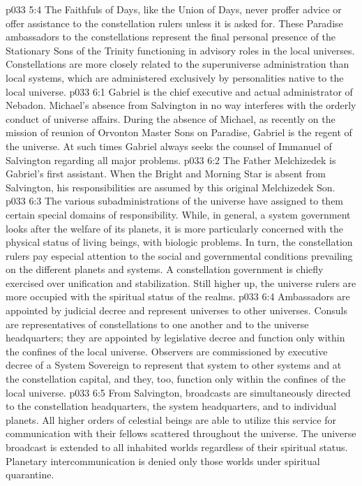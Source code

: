 \vs p033 5:4 The Faithfuls of Days, like the Union of Days, never proffer advice or offer assistance to the constellation rulers unless it is asked for. These Paradise ambassadors to the constellations represent the final personal presence of the Stationary Sons of the Trinity functioning in advisory roles in the local universes. Constellations are more closely related to the superuniverse administration than local systems, which are administered exclusively by personalities native to the local universe.
\vs p033 6:1 Gabriel is the chief executive and actual administrator of Nebadon. Michael’s absence from Salvington in no way interferes with the orderly conduct of universe affairs. During the absence of Michael, as recently on the mission of reunion of Orvonton Master Sons on Paradise, Gabriel is the regent of the universe. At such times Gabriel always seeks the counsel of Immanuel of Salvington regarding all major problems.
\vs p033 6:2 The Father Melchizedek is Gabriel’s first assistant. When the Bright and Morning Star is absent from Salvington, his responsibilities are assumed by this original Melchizedek Son.
\vs p033 6:3 \pc The various subadministrations of the universe have assigned to them certain special domains of responsibility. While, in general, a system government looks after the welfare of its planets, it is more particularly concerned with the physical status of living beings, with biologic problems. In turn, the constellation rulers pay especial attention to the social and governmental conditions prevailing on the different planets and systems. A constellation government is chiefly exercised over unification and stabilization. Still higher up, the universe rulers are more occupied with the spiritual status of the realms.
\vs p033 6:4 \pc Ambassadors are appointed by judicial decree and represent universes to other universes. Consuls are representatives of constellations to one another and to the universe headquarters; they are appointed by legislative decree and function only within the confines of the local universe. Observers are commissioned by executive decree of a System Sovereign to represent that system to other systems and at the constellation capital, and they, too, function only within the confines of the local universe.
\vs p033 6:5 \pc From Salvington, broadcasts are simultaneously directed to the constellation headquarters, the system headquarters, and to individual planets. All higher orders of celestial beings are able to utilize this service for communication with their fellows scattered throughout the universe. The universe broadcast is extended to all inhabited worlds regardless of their spiritual status. Planetary intercommunication is denied only those worlds under spiritual quarantine.
